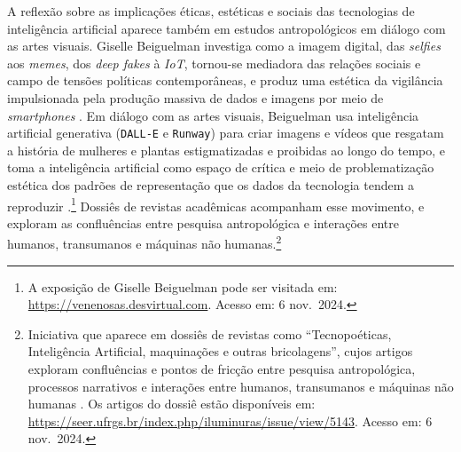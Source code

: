 A reflexão sobre as implicações éticas, estéticas e sociais das tecnologias de inteligência artificial aparece também em estudos antropológicos em diálogo com as artes visuais. Giselle Beiguelman investiga como a imagem digital, das \textit{selfies} aos \textit{memes}, dos \textit{deep fakes} à \textit{IoT}, tornou-se mediadora das relações sociais e campo de tensões políticas contemporâneas, e produz uma estética da vigilância impulsionada pela produção massiva de dados e imagens por meio de \textit{smartphones} \parencite{beiguelman2021}. Em diálogo com as artes visuais, Beiguelman usa inteligência artificial generativa (\texttt{DALL-E} e \texttt{Runway}) para criar imagens e vídeos que resgatam a história de mulheres e plantas estigmatizadas e proibidas ao longo do tempo, e toma a inteligência artificial como espaço de crítica e meio de problematização estética dos padrões de representação que os dados da tecnologia tendem a reproduzir \parencite{Beiguelman_2025_Venenosas}.\footnote{A exposição de Giselle Beiguelman pode ser visitada em: \url{https://venenosas.desvirtual.com}. Acesso em: 6 nov.~2024.} Dossiês de revistas acadêmicas acompanham esse movimento, e exploram as confluências entre pesquisa antropológica e interações entre humanos, transumanos e máquinas não humanas.\footnote{Iniciativa que aparece em dossiês de revistas como \enquote{Tecnopoéticas, Inteligência Artificial, maquinações e outras bricolagens}, cujos artigos exploram confluências e pontos de fricção entre pesquisa antropológica, processos narrativos e interações entre humanos, transumanos e máquinas não humanas \parencite{Magni_2024_Apresentacao}. Os artigos do dossiê estão disponíveis em: \url{https://seer.ufrgs.br/index.php/iluminuras/issue/view/5143}. Acesso em: 6 nov.~2024.}

